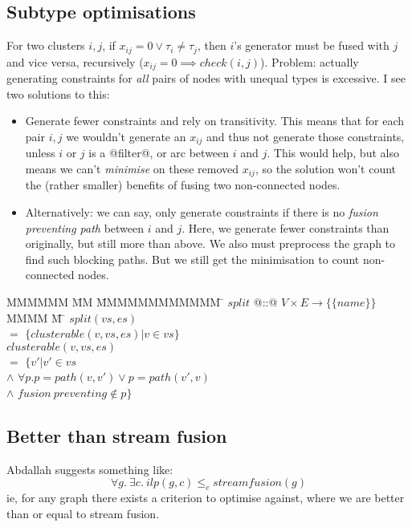 \subsection{Subtype optimisations}
For two clusters $i, j$, if $x_{ij} = 0 \vee \tau_i \not= \tau_j$, then $i$'s generator must be fused with $j$ and vice versa, recursively ($x_{ij} = 0 \implies check(i,j)$).
Problem: actually generating constraints for \emph{all} pairs of nodes with unequal types is excessive.
I see two solutions to this:
\begin{itemize}
\item
Generate fewer constraints and rely on transitivity.
This means that for each pair $i,j$ we wouldn't generate an $x_{ij}$ and thus not generate those constraints, unless $i$ or $j$ is a @filter@, or arc between $i$ and $j$.
This would help, but also means we can't \emph{minimise} on these removed $x_{ij}$, so the solution won't count the (rather smaller) benefits of fusing two non-connected nodes.
\item
Alternatively:
we can say, only generate constraints if there is no \emph{fusion preventing path} between $i$ and $j$.
Here, we generate fewer constraints than originally, but still more than above.
We also must preprocess the graph to find such blocking paths.
But we still get the minimisation to count non-connected nodes.
\end{itemize}

\begin{tabbing}
MMMMMM      \= MM   \=  MMMMMMMMMMMM    \=  \kill
$split$     \> @::@ \> $V \times E \to \{ \{name\} \}$      \\
MMMM        \= M    \= \kill
$split(vs,es)$ \\
    \> $=$  \> $\{clusterable(v,vs,es) | v \in vs\}$      \\
$clusterable(v,vs,es)$  \\
    \>$=$       \>$\{v' | v' \in vs$                                \\
    \>$\wedge$  \>$\forall p. p = path(v,v') \vee p = path(v',v)$   \\
    \>$\wedge$  \>$fusion~preventing \not\in p\}$\\
\end{tabbing}

\subsection{Better than stream fusion}
Abdallah suggests something like:
\[
\forall g.\ \exists c.\ ilp(g, c) \le_c streamfusion(g)
\]
ie, for any graph there exists a criterion to optimise against, where we are better than or equal to stream fusion.

